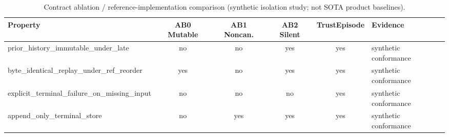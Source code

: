 \begin{table}[!t]
\caption{Contract ablation / reference-implementation comparison (synthetic isolation study; not SOTA product baselines).}
\label{tab:ab-contract}
\centering
\scriptsize
\setlength{\tabcolsep}{3pt}
\begin{tabular}{@{}lccccp{}@{}}
\toprule
\textbf{Property} & \textbf{AB0 Mutable} & \textbf{AB1 Noncan.} & \textbf{AB2 Silent} & \textbf{TrustEpisode} & \textbf{Evidence} \\
\midrule
prior\_history\_immutable\_under\_late & no & no & yes & yes & synthetic conformance \\
byte\_identical\_replay\_under\_ref\_reorder & yes & no & yes & yes & synthetic conformance \\
explicit\_terminal\_failure\_on\_missing\_input & no & no & no & yes & synthetic conformance \\
append\_only\_terminal\_store & no & yes & yes & yes & synthetic conformance \\
\bottomrule
\end{tabular}
\end{table}
